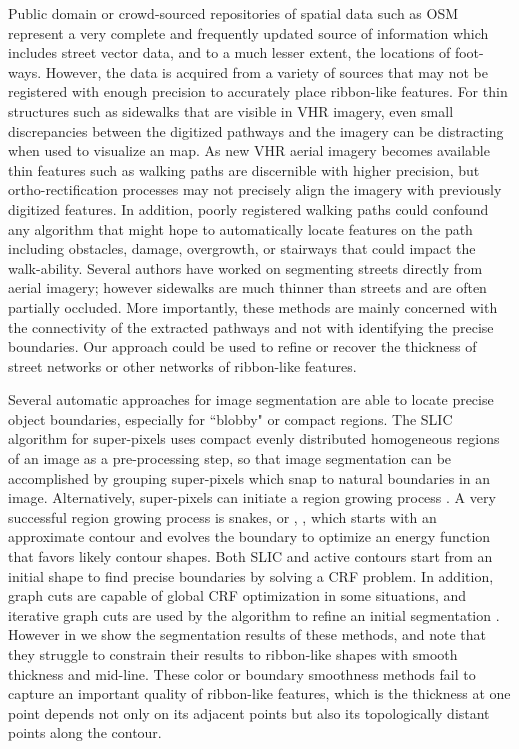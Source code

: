 Public domain or crowd-sourced repositories of spatial data such as \ac{OSM} \cite{OpenStreetMap} represent a very complete and frequently updated source of information which includes street vector data, and to a much lesser extent, the locations of foot-ways. 
However, the data is acquired from a variety of sources that may not be registered with enough precision to accurately place ribbon-like features. 
For thin structures such as sidewalks that are visible in \ac{VHR} imagery, even small discrepancies between the digitized pathways and the imagery can be distracting when used to visualize an  map.  
As new \ac{VHR} aerial imagery becomes available thin features such as walking paths are discernible with higher precision,  but ortho-rectification processes may not precisely align the imagery with previously digitized features. 
In addition, poorly registered walking paths could confound any algorithm that might hope to automatically locate features on the path including obstacles, damage, overgrowth, or stairways that could impact the walk-ability. 
Several authors \cite{femiani2009interval, femiani2007road} have worked on segmenting streets directly from aerial imagery; however sidewalks are much thinner than streets and are often partially occluded. 
More importantly, these methods are mainly concerned with the connectivity of the extracted pathways and not with identifying the precise boundaries.
Our approach could be used to refine or recover the thickness of street networks or other networks of ribbon-like features.

Several automatic approaches \cite{ActiveContou09, Rother2004-ou, Achanta2012-ah} for image segmentation are able to locate precise object boundaries, especially for ``blobby" or compact regions.  
The \ac{SLIC} algorithm for super-pixels \cite{Achanta2012-ah} uses compact evenly distributed homogeneous regions of an image as a pre-processing step, so that image segmentation can be accomplished by grouping super-pixels which  snap to natural boundaries in an image. 
Alternatively, super-pixels can initiate a region growing process \cite{Borovec2017-fz}. A very successful region growing process is snakes, or \ActiveContours{}, \cite{ActiveContou09}, which starts with an approximate  contour and evolves the boundary to optimize an energy function that favors likely contour shapes. 
Both \ac{SLIC} and active contours start from an initial shape to find precise boundaries by solving a \ac{CRF} problem. 
In addition, graph cuts are capable of global \ac{CRF} optimization in some situations, and iterative graph cuts are used by the \GrabCut{} algorithm to refine an initial segmentation \cite{Rother2004-ou}.
However in  we show the segmentation results of these methods, and note that  they struggle to constrain their results to ribbon-like shapes with smooth thickness and mid-line.
These color or boundary smoothness methods fail to capture an important quality of ribbon-like features, which is the thickness at one point depends not only on its adjacent points but also its topologically distant points along the contour.

